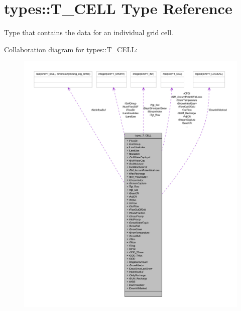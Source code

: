 \hypertarget{typetypes_1_1_t___c_e_l_l}{
\section{types::T\_\-CELL Type Reference}
\label{typetypes_1_1_t___c_e_l_l}
}


Type that contains the data for an individual grid cell.  




Collaboration diagram for types::T\_\-CELL:\nopagebreak
\begin{figure}[H]
\begin{center}
\leavevmode
\includegraphics[width=400pt]{typetypes_1_1_t___c_e_l_l__coll__graph}
\end{center}
\end{figure}

